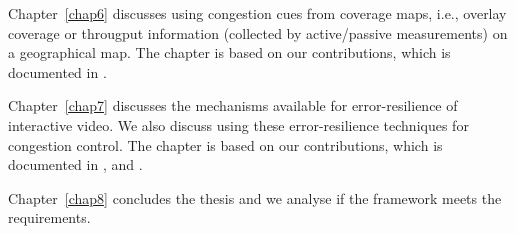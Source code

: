 Chapter~\ref{chap6} discusses using congestion cues from coverage maps, i.e.,
overlay coverage or througput information (collected by active/passive
measurements) on a geographical map. The chapter is based on our contributions, 
which is documented in .

Chapter~\ref{chap7} discusses the mechanisms available for error-resilience
of interactive video. We also discuss using these error-resilience techniques
for congestion control. The chapter is based on our contributions, which is
documented in , and .


Chapter~\ref{chap8} concludes the thesis and we analyse if the framework meets
the requirements.

